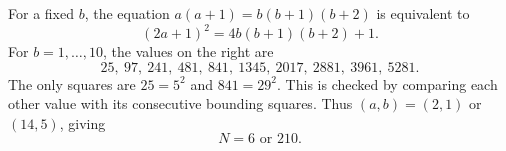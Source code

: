 For a fixed $b$, the equation $a(a+1)=b(b+1)(b+2)$ is equivalent to
\[
(2a+1)^2=4b(b+1)(b+2)+1.
\]
For $b=1,\ldots,10$, the values on the right are
\[
25,\ 97,\ 241,\ 481,\ 841,\ 1345,\ 2017,\ 2881,\ 3961,\ 5281.
\]
The only squares are $25=5^2$ and $841=29^2$. This is checked by comparing each other value with its consecutive bounding squares. Thus $(a,b)=(2,1)$ or $(14,5)$, giving
\[
\boxed{N=6\text{ or }210}.
\]
